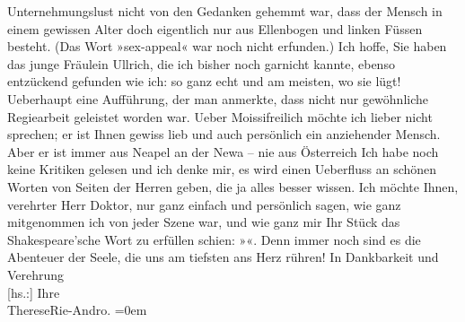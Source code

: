 \begin{ledgroupsized}[t]{13cm}
               Unternehmungslust nicht von den Gedanken gehemmt war, dass der Mensch in einem
               gewissen Alter doch eigentlich nur aus Ellenbogen und linken Füssen besteht. (Das
               Wort »sex-appeal« war noch nicht erfunden.) Ich hoffe, Sie haben das junge Fräulein
                  Ullrich, die ich bisher noch garnicht
               kannte, ebenso entzückend gefunden wie ich: so ganz echt und am meisten, wo sie
               lügt!\pend
           \pstart
           Ueberhaupt eine Aufführung, der man anmerkte, dass nicht nur gewöhnliche Regiearbeit
               geleistet worden war. Ueber Moissifreilich möchte ich lieber nicht
               sprechen; er ist Ihnen gewiss lieb und auch persönlich ein anziehender Mensch. Aber
               er ist immer aus Neapel an der Newa – nie aus Österreich\pend
           \pstart
           Ich habe noch keine Kritiken gelesen und ich denke mir, es wird einen Ueberfluss an
               schönen Worten von Seiten der Herren geben, die ja alles besser wissen. Ich möchte
               Ihnen, verehrter Herr Doktor, nur ganz einfach und persönlich sagen, wie ganz
               mitgenommen ich von jeder Szene war, und wie ganz mir Ihr Stück das Shakespeare’sche Wort zu erfüllen schien: »\label{K_L02567-2v}\label{K_L02567-2h}«. Denn immer noch sind es die Abenteuer der Seele, die uns am tiefsten ans
               Herz rühren!\pend
           \pstart
           In Dankbarkeit und Verehrung{\\[\baselineskip]}{[}hs.:{]} Ihre{\\[\baselineskip]}\spacefill\mbox{ThereseRie-Andro.}\pend
           \leftskip=0em{}
         
         \endnumbering{}\end{ledgroupsized}  \newcommand{\dateiname}{L02567}\newcommand{\titel}{Therese Rie-Andro an Arthur Schnitzler, 22. 12. 1929}\newcommand{\editorInnen}{Martin Anton Müller und Gerd-Hermann Susen}
      